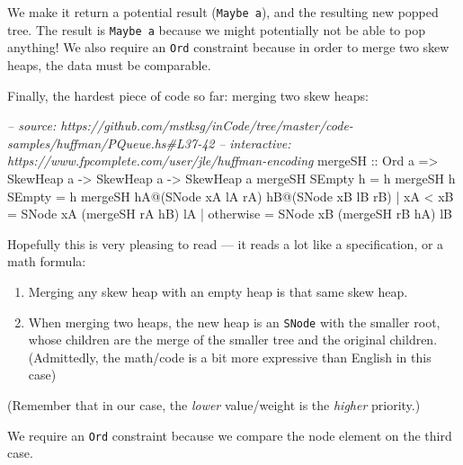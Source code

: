 \documentclass[]{article}
\newenvironment{Shaded}{}{}
\newcommand{\DataTypeTok}[1]{\textcolor[rgb]{0.56,0.13,0.00}{#1}}
\newcommand{\CommentTok}[1]{\textcolor[rgb]{0.38,0.63,0.69}{\textit{#1}}}
\newcommand{\OtherTok}[1]{\textcolor[rgb]{0.00,0.44,0.13}{#1}}
\newcommand{\FunctionTok}[1]{\textcolor[rgb]{0.02,0.16,0.49}{#1}}
\newcommand{\NormalTok}[1]{#1}
\begin{document}
We make it return a potential result (\texttt{Maybe\ a}), and the resulting new
popped tree. The result is \texttt{Maybe\ a} because we might potentially not be
able to pop anything! We also require an \texttt{Ord} constraint because in
order to merge two skew heaps, the data must be comparable.

Finally, the hardest piece of code so far: merging two skew heaps:

\begin{Shaded}
\begin{Highlighting}[]
\CommentTok{-- source: https://github.com/mstksg/inCode/tree/master/code-samples/huffman/PQueue.hs#L37-42}
\CommentTok{-- interactive: https://www.fpcomplete.com/user/jle/huffman-encoding}
\OtherTok{mergeSH ::} \DataTypeTok{Ord}\NormalTok{ a }\OtherTok{=>} \DataTypeTok{SkewHeap}\NormalTok{ a }\OtherTok{->} \DataTypeTok{SkewHeap}\NormalTok{ a }\OtherTok{->} \DataTypeTok{SkewHeap}\NormalTok{ a}
\NormalTok{mergeSH }\DataTypeTok{SEmpty}\NormalTok{ h }\FunctionTok{=}\NormalTok{ h}
\NormalTok{mergeSH h }\DataTypeTok{SEmpty} \FunctionTok{=}\NormalTok{ h}
\NormalTok{mergeSH hA}\FunctionTok{@}\NormalTok{(}\DataTypeTok{SNode}\NormalTok{ xA lA rA) hB}\FunctionTok{@}\NormalTok{(}\DataTypeTok{SNode}\NormalTok{ xB lB rB)}
    \FunctionTok{|}\NormalTok{ xA }\FunctionTok{<}\NormalTok{ xB    }\FunctionTok{=} \DataTypeTok{SNode}\NormalTok{ xA (mergeSH rA hB) lA}
    \FunctionTok{|}\NormalTok{ otherwise  }\FunctionTok{=} \DataTypeTok{SNode}\NormalTok{ xB (mergeSH rB hA) lB}
\end{Highlighting}
\end{Shaded}

Hopefully this is very pleasing to read --- it reads a lot like a specification,
or a math formula:

\begin{enumerate}
\def\labelenumi{\arabic{enumi}.}
\tightlist
\item
  Merging any skew heap with an empty heap is that same skew heap.
\item
  When merging two heaps, the new heap is an \texttt{SNode} with the smaller
  root, whose children are the merge of the smaller tree and the original
  children. (Admittedly, the math/code is a bit more expressive than English in
  this case)
\end{enumerate}

(Remember that in our case, the \emph{lower} value/weight is the \emph{higher}
priority.)

We require an \texttt{Ord} constraint because we compare the node element on the
third case.
\end{document}
